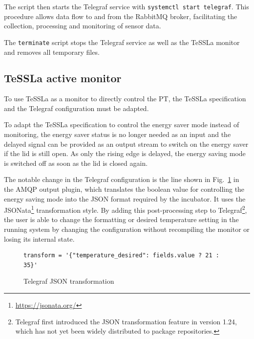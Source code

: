 %
The script then starts the Telegraf service with \lstinline{systemctl start telegraf}. This procedure allows data flow to and from the RabbitMQ broker, facilitating the collection, processing and monitoring of sensor data.

The \texttt{terminate} script stops the Telegraf service as well as the TeSSLa monitor and removes all temporary files.

\subsection{TeSSLa active monitor}\label{subsec:TESLA2}
To use TeSSLa as a monitor to directly control the PT, the TeSSLa specification and the Telegraf configuration must be adapted.

To adapt the TeSSLa specification to control the energy saver mode instead of monitoring, the energy saver status is no longer needed as an input and the delayed signal can be provided as an output stream to switch on the energy saver if the lid is still open. As only the rising edge is delayed, the energy saving mode is switched off as soon as the lid is closed again.

The notable change in the Telegraf configuration is the line shown in Fig.~\ref{fig:telegraf_json_transformation} in the AMQP output plugin, which translates the boolean value for controlling the energy saving mode into the JSON format required by the incubator. It uses the JSONata\footnote{\url{https://jsonata.org/}} transformation style.
By adding this post-processing step to Telegraf\footnote{
	Telegraf first introduced the JSON transformation feature in version 1.24, which has not yet been widely distributed to package repositories.
}, the user is able to change the formatting or desired temperature setting in the running system by changing the configuration without recompiling the monitor or losing its internal state.%
%
\begin{figure}[H]
	\begin{lstlisting}
transform = '{"temperature_desired": fields.value ? 21 : 35}'
    \end{lstlisting}
	\caption{Telegraf JSON transformation}
	\label{fig:telegraf_json_transformation}
\end{figure}















